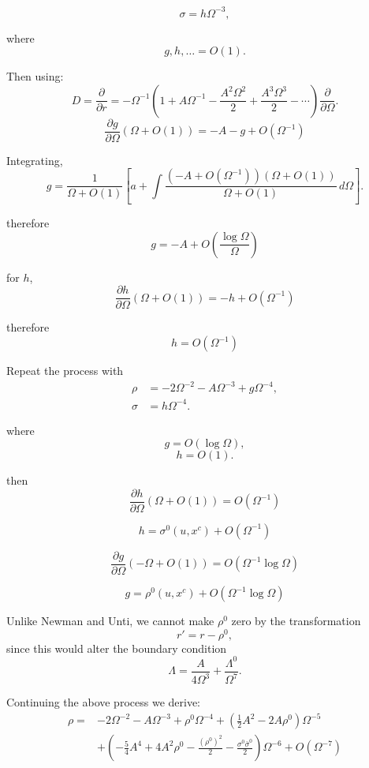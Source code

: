 \[
\sigma = h\Omega^{-3},
\]

where
\[
g,h,\ldots = O(1).
\]

Then using:
\[
D
=
\frac{\partial}{\partial r}
=
-\Omega^{-1}
\left(
1 + A\Omega^{-1}
-\frac{A^2\Omega^2}{2}
+\frac{A^3\Omega^3}{2}
-\cdots
\right)
\frac{\partial}{\partial\Omega}.
\]
\[
\frac{\partial g}{\partial \Omega}
\left(\Omega + O(1)\right)
=
-A-g+O(\Omega^{-1})
\]

Integrating,
\[
g
=
\frac{1}{\Omega+O(1)}
\left[
a+
\int
\frac{
\left(-A+O(\Omega^{-1})\right)
\left(\Omega+O(1)\right)
}{
\Omega+O(1)
}
\,d\Omega
\right].
\]

therefore
\begin{equation}
g
=
-A
+
O\left(\frac{\log\Omega}{\Omega}\right)
\tag{6.9}
\end{equation}

for $h$,
\[
\frac{\partial h}{\partial\Omega}
\left(\Omega+O(1)\right)
=
-h+O(\Omega^{-1})
\]

therefore
\begin{equation}
h
=
O(\Omega^{-1})
\tag{6.10}
\end{equation}

Repeat the process with
\begin{align}
\rho &= -2\Omega^{-2} - A\Omega^{-3} + g\Omega^{-4},
\tag{6.12}\\
\sigma &= h\Omega^{-4}.
\end{align}

where
\[
g = O(\log\Omega),
\]
\[
h = O(1).
\]

then
\[
\frac{\partial h}{\partial\Omega}
\left(\Omega + O(1)\right)
=
O(\Omega^{-1})
\]

\begin{equation}
h
=
\sigma^{0}(u,x^{c})
+
O(\Omega^{-1})
\tag{6.13}
\end{equation}

\[
\frac{\partial g}{\partial\Omega}
\left(-\Omega + O(1)\right)
=
O(\Omega^{-1}\log\Omega)
\]

\begin{equation}
g
=
\rho^{0}(u,x^{c})
+
O(\Omega^{-1}\log\Omega)
\tag{6.14}
\end{equation}

Unlike Newman and Unti, we cannot make $\rho^{0}$ zero by
the transformation
\[
r' = r - \rho^{0},
\]
since this would alter the boundary condition
\[
\Lambda
=
\frac{A}{4\Omega^{3}}
+
\frac{\Lambda^{0}}{\Omega^{7}}.
\]

Continuing the above process we derive:
\begin{equation}
\begin{aligned}
\rho
={}&
-2\Omega^{-2}
-A\Omega^{-3}
+\rho^{0}\Omega^{-4}
+\left(
\frac{1}{2}A^{2}
-2A\rho^{0}
\right)\Omega^{-5}
\\
&+
\left(
-\frac{5}{4}A^{4}
+4A^{2}\rho^{0}
-\frac{(\rho^{0})^{2}}{2}
-\frac{\sigma^{0}\bar{\sigma}^{0}}{2}
\right)\Omega^{-6}
+O(\Omega^{-7})
\end{aligned}
\tag{6.15}
\end{equation}


